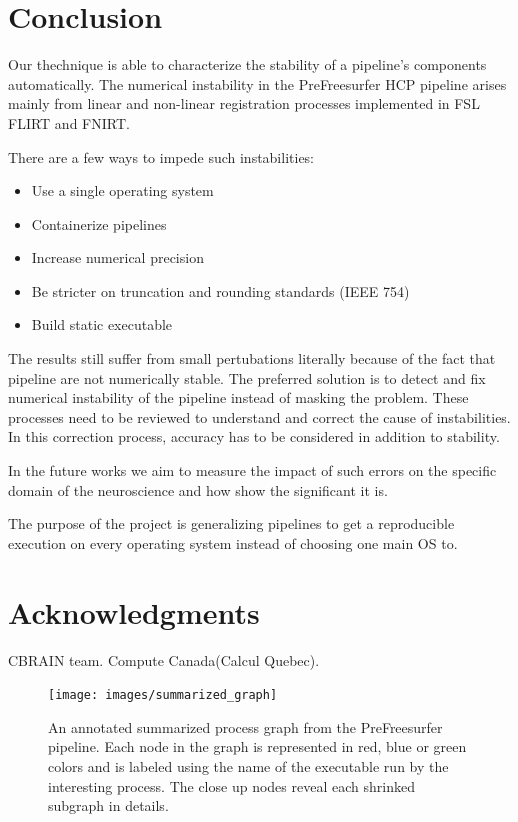 \documentclass{article}
\begin{document}
\section{Conclusion}

Our thechnique is able to characterize the stability of a pipeline's components automatically.
The numerical instability in the PreFreesurfer HCP pipeline arises mainly from
linear and non-linear registration processes implemented in FSL FLIRT and FNIRT. 

There are a few ways to impede such instabilities:
\begin{itemize}
\item Use a single operating system
\item Containerize pipelines
\item Increase numerical precision
\item Be stricter on truncation and rounding standards (IEEE 754)
\item Build static executable
\end{itemize}

The results still suffer from small pertubations literally because of the fact that pipeline are not numerically stable.
The preferred solution is to detect and fix numerical instability of the pipeline instead of masking the problem.
These processes need to be reviewed to understand and correct the cause of instabilities. 
In this correction process, accuracy has to be considered in addition to stability.

\item In the future works we aim to measure the impact of such errors
on the specific domain of the neuroscience and how show the significant it is.

\item The purpose of the project is generalizing pipelines to get a reproducible execution 
on every operating system instead of choosing one main OS to.


\section{Acknowledgments}

CBRAIN team. Compute Canada(Calcul Quebec).


\begin{figure}[H]
  \texttt{[image: images/summarized\_graph]}
  \caption{An annotated summarized process graph from the PreFreesurfer pipeline.
Each node in the graph is represented in red, blue or green colors and is labeled 
using the name of the executable run by the interesting process. The close up nodes 
reveal each shrinked subgraph in details.}
  \label{fig:summarized-graph}
\end{figure}
\end{document}
